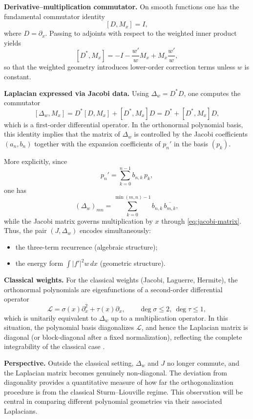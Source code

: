\documentclass{amsart}
\numberwithin{equation}{section}
\theoremstyle{definition}
\theoremstyle{remark}
\begin{document}
\medskip
\noindent\textbf{Derivative--multiplication commutator.}
On smooth functions one has the fundamental commutator identity
\begin{equation}\label{eq:commutator}
[D,M_x]=I,
\end{equation}
where $D=\partial_x$.
Passing to adjoints with respect to the weighted inner product yields
\[
[D^*,M_x]=-I - \frac{w'}{w} M_x + M_x\frac{w'}{w},
\]
so that the weighted geometry introduces lower-order correction terms
unless $w$ is constant.

\medskip
\noindent\textbf{Laplacian expressed via Jacobi data.}
Using $\Delta_w=D^*D$, one computes the commutator
\begin{equation}\label{eq:laplacian-commutator}
[\Delta_w,M_x]
= D^*[D,M_x] + [D^*,M_x]D
= D^* + [D^*,M_x]D,
\end{equation}
which is a first-order differential operator.
In the orthonormal polynomial basis, this identity implies that the matrix
of $\Delta_w$ is controlled by the Jacobi coefficients $(a_n,b_n)$ together
with the expansion coefficients of $p_n'$ in the basis $(p_k)$.

More explicitly, since
\[
p_n'=\sum_{k=0}^{n-1} b_{n,k}\,p_k,
\]
one has
\[
(\Delta_w)_{mn}
=\sum_{k=0}^{\min(m,n)-1} b_{n,k}\,\overline{b_{m,k}},
\]
while the Jacobi matrix governs multiplication by $x$ through \eqref{eq:jacobi-matrix}.
Thus, the pair $(J,\Delta_w)$ encodes simultaneously:
\begin{itemize}
  \item the three-term recurrence (algebraic structure);
  \item the energy form $\int |f'|^2w\,dx$ (geometric structure).
\end{itemize}

\medskip
\noindent\textbf{Classical weights.}
For the classical weights (Jacobi, Laguerre, Hermite), the orthonormal polynomials
are eigenfunctions of a second-order differential operator
\[
\mathcal L=\sigma(x)\partial_x^2+\tau(x)\partial_x,
\qquad \deg\sigma\le2,\ \deg\tau\le1,
\]
which is unitarily equivalent to $\Delta_w$ up to a multiplication operator.
In this situation, the polynomial basis diagonalizes $\mathcal L$,
and hence the Laplacian matrix is diagonal (or block-diagonal after a fixed
normalization), reflecting the complete integrability of the classical case
\cite{Szego,Chihara}.

\medskip
\noindent\textbf{Perspective.}
Outside the classical setting, $\Delta_w$ and $J$ no longer commute,
and the Laplacian matrix becomes genuinely non-diagonal.
The deviation from diagonality provides a quantitative measure of how far
the orthogonalization procedure is from the classical Sturm--Liouville regime.
This observation will be central in comparing different polynomial geometries
via their associated Laplacians.
\end{document}
